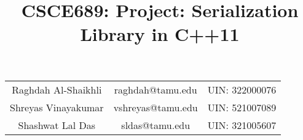 \documentclass{article}
\begin{document}
\title{\textbf{CSCE689: Project: Serialization Library in C++11}}
\maketitle

\begin{center}

\begin{tabular}{c c c}
Raghdah Al-Shaikhli & raghdah@tamu.edu & UIN: 322000076 \\
Shreyas Vinayakumar & vshreyas@tamu.edu & UIN: 521007089 \\
Shashwat Lal Das & sldas@tamu.edu & UIN: 321005607 \\ 
\end{tabular}
\end{center}

\vspace{0.2cm}
\end{document}
